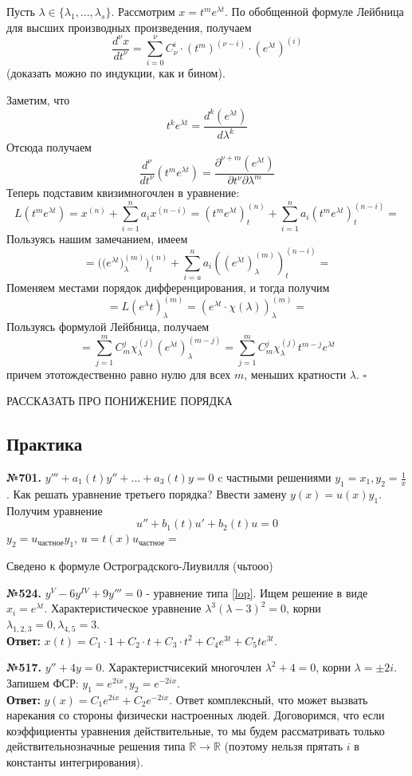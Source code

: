 Пусть $\lambda\in \{\lambda_1,...,\lambda_s\}$. Рассмотрим 
$x=t^me^{\lambda t}$. По обобщенной формуле Лейбница для высших производных
произведения, получаем
$$\frac{d^\nu x}{dt^\nu} = \sum\limits_{i=0}^{\nu} C^i_\nu \cdot 
(t^m)^{(\nu - i)}\cdot (e^{\lambda t})^{(i)}$$ 
(доказать можно по индукции, как и бином). 

Заметим, что 
$$t^ke^{\lambda t} = \frac{d^{k}(e^{\lambda t})}{d\lambda^{k}}$$
Отсюда получаем 
$$\frac{d^\nu }{dt^\nu}(t^me^{\lambda t}) = 
\frac{\partial^{\nu+m} (e^{\lambda t})}{\partial t^\nu \partial\lambda^m} $$
Теперь подставим квизимногочлен в уравнение:
$$L(t^me^{\lambda t}) = x^{(n)}+\sum\limits_{i=1}^{n} a_ix^{(n-i)} = 
(t^me^{\lambda t})^{(n)}_t+\sum\limits_{i=1}^{n} 
a_i(t^me^{\lambda t})^{(n-i)}_t=$$
Пользуясь нашим замечанием, имеем
$$=\big(\Big(e^{\lambda t}\Big)^{(m)}_\lambda\big)^{(n)}_t + 
\sum\limits_{i=a}^{n} a_i((e^{\lambda t})^{(m)}_\lambda)^{(n-i)}_t=$$
Поменяем местами порядок дифференцирования, и тогда получим
$$=L(e^\lambda t)^{(m)}_\lambda = (e^{\lambda t}\cdot 
\chi(\lambda))^{(m)}_\lambda = $$ 
Пользуясь формулой Лейбница, получаем
$$=\sum\limits_{j=1}^{m} C^j_m\chi^{(j)}_\lambda(e^{\lambda t})^{(m-j)}_\lambda
= \sum\limits_{j=1}^{m} C^j_m\chi^{(j)}_\lambda t^{m-j}e^{\lambda t}$$
причем этотождественно равно нулю для всех $m$, меньших кратности  $\lambda$. 
$\square$

РАССКАЗАТЬ ПРО ПОНИЖЕНИЕ ПОРЯДКА


\subsection{Практика} %

\textbf{№701.} $y'''+a_1(t)y''+...+a_3(t)y=0$ c частными решениями 
$y_1=x_1,y_2=\frac{1}{x}$. Как решать уравнение третьего порядка?
Ввести замену $y(x)=u(x)y_1$. Получим уравнение 
$$u''+b_1(t)u'+b_2(t)u=0$$
$y_2=u_\text{частное}y_1$, $u=t(x)u_\text{частное}=$

Сведено к формуле Остроградского-Лиувилля (чьтооо)

\textbf{№524.} $y^V-6y^{IV}+9y'''=0$ - уравнение типа \ref{lop}.
Ищем решение в виде $x_i = e^{\lambda t}$. 
Характеристическое уравнение $\lambda^3(\lambda-3)^2=0$,
корни $\lambda_{1,2,3}=0,\lambda_{4,5}=3$. \\
\textbf{Ответ:} $x(t)=C_1\cdot 1+
C_2\cdot t+C_3\cdot t^2+C_4e^{3t}+C_5te^{3t}$. 

\textbf{№517.} $y''+4y=0$. Характеристчисекий многочлен  $\lambda^2+4=0$,
корни $\lambda=\pm 2i$. Запишем ФСР: 
$y_1=e^{2ix},y_2=e^{-2ix}$.\\
\textbf{Ответ:} $y(x) = C_1e^{2ix} + C_2e^{-2ix}$.
Ответ комплексный, что может вызвать нарекания со стороны физически
настроенных людей. Договоримся, что если коэффициенты уравнения 
действительные, то мы будем рассматривать только действительнозначные 
решения типа $\mathbb{R}\to \mathbb{R}$ (поэтому нельзя прятать 
$i$ в константы интегрирования). 

